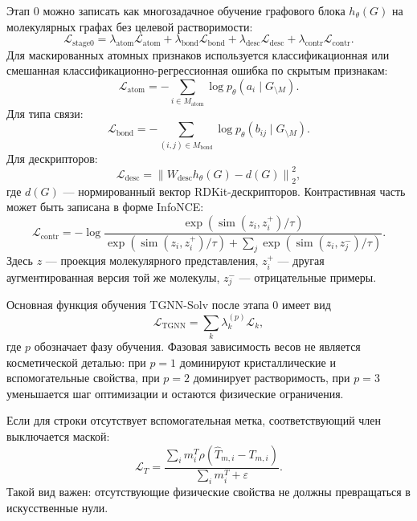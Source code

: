 \documentclass[11pt]{article}
\theoremstyle{definition}
\begin{document}
Этап 0 можно записать как многозадачное обучение графового блока $h_\theta(G)$ на молекулярных графах без целевой растворимости:
\begin{equation*}
    \mathcal L_{\mathrm{stage0}}
    = \lambda_{\mathrm{atom}}\mathcal L_{\mathrm{atom}}
    + \lambda_{\mathrm{bond}}\mathcal L_{\mathrm{bond}}
    + \lambda_{\mathrm{desc}}\mathcal L_{\mathrm{desc}}
    + \lambda_{\mathrm{contr}}\mathcal L_{\mathrm{contr}}.
\end{equation*}
Для маскированных атомных признаков используется классификационная или смешанная классификационно-регрессионная ошибка по скрытым признакам:
\begin{equation*}
    \mathcal L_{\mathrm{atom}}
    = -\sum_{i\in M_{\mathrm{atom}}}\log p_\theta(a_i\mid G_{\setminus M}).
\end{equation*}
Для типа связи:
\begin{equation*}
    \mathcal L_{\mathrm{bond}}
    = -\sum_{(i,j)\in M_{\mathrm{bond}}}\log p_\theta(b_{ij}\mid G_{\setminus M}).
\end{equation*}
Для дескрипторов:
\begin{equation*}
    \mathcal L_{\mathrm{desc}}
    = \left\| W_{\mathrm{desc}} h_\theta(G)-d(G)\right\|_2^2,
\end{equation*}
где $d(G)$ --- нормированный вектор RDKit-дескрипторов. Контрастивная часть может быть записана в форме InfoNCE:
\begin{equation*}
    \mathcal L_{\mathrm{contr}}
    =-\log
    \frac{\exp(\operatorname{sim}(z_i,z_i^+)/\tau)}
    {\exp(\operatorname{sim}(z_i,z_i^+)/\tau)+
     \sum_j\exp(\operatorname{sim}(z_i,z_j^-)/\tau)}.
\end{equation*}
Здесь $z$ --- проекция молекулярного представления, $z_i^+$ --- другая аугментированная версия той же молекулы, $z_j^-$ --- отрицательные примеры.

Основная функция обучения TGNN-Solv после этапа 0 имеет вид
\begin{equation*}
    \mathcal L_{\mathrm{TGNN}}
    = \sum_k \lambda_k^{(p)} \mathcal L_k,
\end{equation*}
где $p$ обозначает фазу обучения. Фазовая зависимость весов не является косметической деталью: при $p=1$ доминируют кристаллические и вспомогательные свойства, при $p=2$ доминирует растворимость, при $p=3$ уменьшается шаг оптимизации и остаются физические ограничения.

Если для строки отсутствует вспомогательная метка, соответствующий член выключается маской:
\begin{equation*}
    \mathcal L_T
    = \frac{\sum_i m_i^T \rho(\widehat T_{m,i}-T_{m,i})}
           {\sum_i m_i^T+\varepsilon}.
\end{equation*}
Такой вид важен: отсутствующие физические свойства не должны превращаться в искусственные нули.
\end{document}

